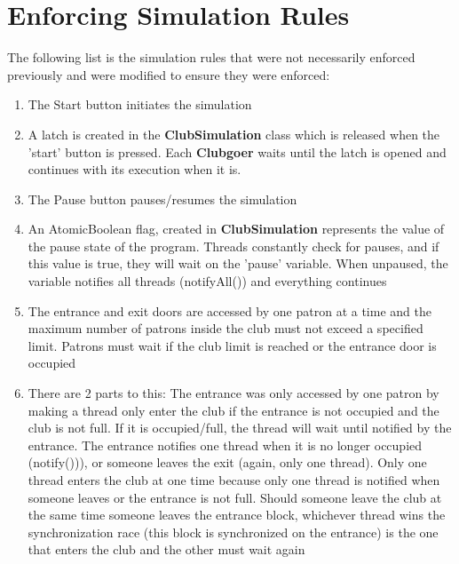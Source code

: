 \documentclass{assignment}
\begin{document}


\newpage

\section{Enforcing Simulation Rules}
The following list is the simulation rules that were not necessarily enforced previously and were modified to ensure they were enforced: \\
\begin{enumerate}
    \item {The Start button initiates the simulation}
    
    \item[]{A latch is created in the \textbf{ClubSimulation} class which is released when the 'start' button is pressed. Each \textbf{Clubgoer} waits until the latch is opened and continues with its execution when it is.}
    \item{The Pause button pauses/resumes the simulation}
    \item[]{An AtomicBoolean flag, created in \textbf{ClubSimulation} represents the value of the pause state of the program. Threads constantly check for pauses, and if this value is true, they will wait on the 'pause' variable. When unpaused, the variable notifies all threads (notifyAll()) and everything continues}

    \item{The entrance and exit doors are accessed by one patron at a time and the maximum number of patrons inside the club must not exceed a specified limit. Patrons must wait if the club limit is reached or the entrance door is occupied}
    \item[]{There are 2 parts to this: The entrance was only accessed by one patron by making a thread only enter the club if the entrance is not occupied and the club is not full. If it is occupied/full, the thread will wait until notified by the entrance. The entrance notifies one thread when it is no longer occupied (notify())), or someone leaves the exit (again, only one thread). 
Only one thread enters the club at one time because only one thread is notified when someone leaves or the entrance is not full. Should someone leave the club at the same time someone leaves the entrance block, whichever thread wins the synchronization race (this block is synchronized on the entrance) is the one that enters the club and the other must wait again
          

}
\end{enumerate}
\end{document}
